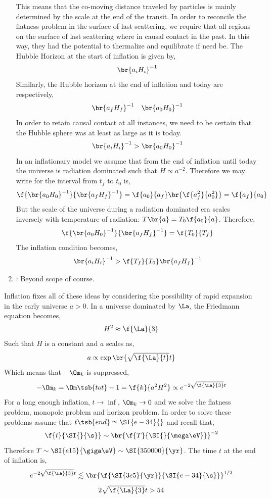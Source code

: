 \documentclass{article}
\begin{document}
\begin{enumerate}
    This means that the co-moving distance traveled by particles is mainly determined by the scale at the end of the transit. In order to reconcile the flatness problem in the surface of last scattering, we require that all regions on the surface of last scattering where in causal contact in the past. In this way, they had the potential to thermalize and equilibrate if need be. The Hubble Horizon at the start of inflation is given by,
    \[ \br{a_{i} H_{i}}^{-1} \]
    Similarly, the Hubble horizon at the end of inflation and today are respectively,
    \[ \br{a_{f} H_{f}}^{-1} \quad \br{a_{0} H_{0}}^{-1} \]
    In order to retain causal contact at all instances, we need to be certain that the Hubble sphere was at least as large as it is today.
    \[ \br{a_{i} H_{i}}^{-1} > \br{a_{0} H_{0}}^{-1} \]
    In an inflationary model we assume that from the end of inflation until today the universe is radiation dominated such that $H \propto a^{-2}$. Therefore we may write for the interval from $t_f$ to $t_0$ is,
    \[ \f{\br{a_{0} H_{0}}^{-1}}{\br{a_{f} H_{f}}^{-1}} = \f{a_0}{a_f}\br{\f{a_f^2}{a_0^2}} = \f{a_f}{a_0} \]
    But the scale of the universe during a radiation dominated era scales inversely with temperature of radiation: $T\br{a} = T_{0} \f{a_0}{a}$. Therefore,
    \[ \f{\br{a_{0} H_{0}}^{-1}}{\br{a_{f} H_{f}}^{-1}} = \f{T_0}{T_f} \]
    The inflation condition becomes,
    \[ \br{a_{i} H_{i}}^{-1} > \f{T_f}{T_0} \br{a_{f} H_{f}}^{-1} \]
    \item {}: Beyond scope of course.
\end{enumerate}

Inflation fixes all of these ideas by considering the possibility of rapid expansion in the early universe $\dot a > 0$. In a universe dominated by $\La$, the Friedmann equation becomes,
\[ H^2 \approx \f{\La}{3} \]
Such that $H$ is a constant and $a$ scales as,
\[ a \propto \exp\br{\sqrt{\f{\La}{t}} t} \]
Which means that $-\Om_k$ is suppressed,
\[ - \Om_k = \Om\tsb{tot} - 1 = \f{k}{a^2 H^2} \propto e^{- 2\sqrt{\f{\La}{3}} t} \]
For a long enough inflation, $t \to \inf$, $\Om_k \to 0$ and we solve the flatness problem, monopole problem and horizon problem. In order to solve these problems assume that $t\tsb{end} \simeq \SI{e-34}{}$ and recall that,
\[ \f{t}{\SI{}{\s}} \sim \br{\f{T}{\SI{}{\mega\eV}}}^{-2} \]
Therefore $T \sim \SI{e15}{\giga\eV} \sim \SI{350000}{\yr}$. The time $t$ at the end of inflation is,
\[ e^{- 2\sqrt{\f{\La}{3}} t} \lesssim \br{\f{\SI{3e5}{\yr}}{\SI{e-34}{\s}}}^{1/2} \]
\[ 2\sqrt{\f{\La}{3}} t > 54 \]
\end{document}
